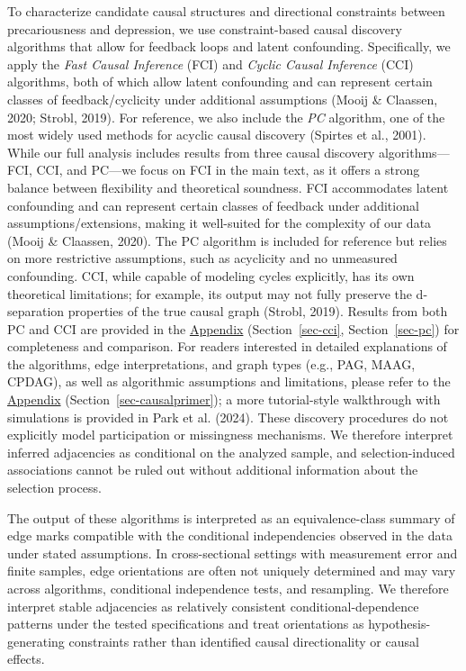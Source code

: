 \documentclass[
]{article}
\begin{document}
\textcolor{BrickRed}{To characterize candidate causal structures and directional constraints between precariousness and depression, we use constraint-based causal discovery algorithms that allow for feedback loops and latent confounding.}
Specifically, we apply the \emph{Fast Causal Inference} (FCI) and
\emph{Cyclic Causal Inference} (CCI) algorithms,
\textcolor{BrickRed}{both of which allow latent confounding and can represent certain classes of feedback/cyclicity under additional assumptions}
(Mooij \& Claassen, 2020; Strobl, 2019). For reference, we also include
the \emph{PC} algorithm, one of the most widely used methods for acyclic
causal discovery (Spirtes et al., 2001). While our full analysis
includes results from three causal discovery algorithms---FCI, CCI, and
PC---we focus on FCI in the main text, as it offers a strong balance
between flexibility and theoretical soundness.
\textcolor{BrickRed}{FCI accommodates latent confounding and can represent certain classes of feedback under additional assumptions/extensions, making it well-suited for the complexity of our data}
(Mooij \& Claassen, 2020). The PC algorithm is included for reference
but relies on more restrictive assumptions, such as acyclicity and no
unmeasured confounding. CCI, while capable of modeling cycles
explicitly, has its own theoretical limitations; for example, its output
may not fully preserve the d-separation properties of the true causal
graph (Strobl, 2019). Results from both PC and CCI are provided in the
\hyperref[sec-appendix]{Appendix}
(Section~\ref{sec-cci}, Section~\ref{sec-pc}) for completeness and
comparison. For readers interested in detailed explanations of the
algorithms, edge interpretations, and graph types (e.g., PAG, MAAG,
CPDAG), as well as algorithmic assumptions and limitations, please refer
to the \hyperref[sec-appendix]{Appendix}
(Section~\ref{sec-causalprimer})\textcolor{BrickRed}{; a more tutorial-style walkthrough with simulations is provided in}
Park et al. (2024).
\textcolor{BrickRed}{These discovery procedures do not explicitly model participation or missingness mechanisms. We therefore interpret inferred adjacencies as conditional on the analyzed sample, and selection-induced associations cannot be ruled out without additional information about the selection process.}

\textcolor{BrickRed}{The output of these algorithms is interpreted as an equivalence-class summary of edge marks compatible with the conditional independencies observed in the data under stated assumptions. In cross-sectional settings with measurement error and finite samples, edge orientations are often not uniquely determined and may vary across algorithms, conditional independence tests, and resampling. We therefore interpret stable adjacencies as relatively consistent conditional-dependence patterns under the tested specifications and treat orientations as hypothesis-generating constraints rather than identified causal directionality or causal effects.}
\end{document}
